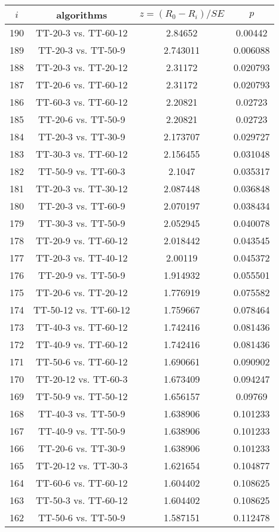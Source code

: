 \documentclass[a4paper,10pt]{article}
\begin{document}
\begin{landscape}
\begin{table}[!htp]
\centering\scriptsize
\begin{tabular}{cccc}
$i$&algorithms&$z=(R_0 - R_i)/SE$&$p$\\
\hline190&TT-20-3 vs. TT-60-12&2.84652&0.00442\\
189&TT-20-3 vs. TT-50-9&2.743011&0.006088\\
188&TT-20-3 vs. TT-20-12&2.31172&0.020793\\
187&TT-20-6 vs. TT-60-12&2.31172&0.020793\\
186&TT-60-3 vs. TT-60-12&2.20821&0.02723\\
185&TT-20-6 vs. TT-50-9&2.20821&0.02723\\
184&TT-20-3 vs. TT-30-9&2.173707&0.029727\\
183&TT-30-3 vs. TT-60-12&2.156455&0.031048\\
182&TT-50-9 vs. TT-60-3&2.1047&0.035317\\
181&TT-20-3 vs. TT-30-12&2.087448&0.036848\\
180&TT-20-3 vs. TT-60-9&2.070197&0.038434\\
179&TT-30-3 vs. TT-50-9&2.052945&0.040078\\
178&TT-20-9 vs. TT-60-12&2.018442&0.043545\\
177&TT-20-3 vs. TT-40-12&2.00119&0.045372\\
176&TT-20-9 vs. TT-50-9&1.914932&0.055501\\
175&TT-20-6 vs. TT-20-12&1.776919&0.075582\\
174&TT-50-12 vs. TT-60-12&1.759667&0.078464\\
173&TT-40-3 vs. TT-60-12&1.742416&0.081436\\
172&TT-40-9 vs. TT-60-12&1.742416&0.081436\\
171&TT-50-6 vs. TT-60-12&1.690661&0.090902\\
170&TT-20-12 vs. TT-60-3&1.673409&0.094247\\
169&TT-50-9 vs. TT-50-12&1.656157&0.09769\\
168&TT-40-3 vs. TT-50-9&1.638906&0.101233\\
167&TT-40-9 vs. TT-50-9&1.638906&0.101233\\
166&TT-20-6 vs. TT-30-9&1.638906&0.101233\\
165&TT-20-12 vs. TT-30-3&1.621654&0.104877\\
164&TT-60-6 vs. TT-60-12&1.604402&0.108625\\
163&TT-50-3 vs. TT-60-12&1.604402&0.108625\\
162&TT-50-6 vs. TT-50-9&1.587151&0.112478\\

\end{tabular}
\end{table}
\end{landscape}
\end{document}
